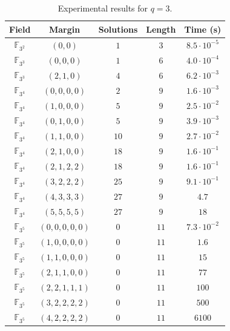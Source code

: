 \begin{table}
  \centering
  \begin{tabular}{|c|c|c|c|c|}
    \hline
    Field & Margin & Solutions & Length & Time (s) \\
    \hline
    \hline
    $\mathbb{F}_{3^2}$ & $(0,0)$ & $1$ & $3$ & $8.5\cdot10^{-5}$ \\
    \hline
    $\mathbb{F}_{3^3}$ & $(0,0,0)$ & $1$ & $6$ & $4.0\cdot10^{-4}$ \\
    \hline
    $\mathbb{F}_{3^3}$ & $(2,1,0)$ & $4$ & $6$ & $6.2\cdot10^{-3}$ \\
    \hline
    $\mathbb{F}_{3^4}$ & $(0,0,0,0)$ & $2$ & $9$ & $1.6\cdot10^{-3}$ \\
    \hline
    $\mathbb{F}_{3^4}$ & $(1,0,0,0)$ & $5$ & $9$ & $2.5\cdot10^{-2}$ \\
    \hline
    $\mathbb{F}_{3^4}$ & $(0,1,0,0)$ & $5$ & $9$ & $3.9\cdot10^{-3}$ \\
    \hline
    $\mathbb{F}_{3^4}$ & $(1,1,0,0)$ & $10$ & $9$ & $2.7\cdot10^{-2}$ \\
    \hline
    $\mathbb{F}_{3^4}$ & $(2,1,0,0)$ & $18$ & $9$ & $1.6\cdot10^{-1}$ \\
    \hline
    $\mathbb{F}_{3^4}$ & $(2,1,2,2)$ & $18$ & $9$ & $1.6\cdot10^{-1}$ \\
    \hline
    $\mathbb{F}_{3^4}$ & $(3,2,2,2)$ & $25$ & $9$ & $9.1\cdot10^{-1}$ \\
    \hline
    $\mathbb{F}_{3^4}$ & $(4,3,3,3)$ & $27$ & $9$ & $4.7$ \\
    \hline
    $\mathbb{F}_{3^4}$ & $(5,5,5,5)$ & $27$ & $9$ & $18$ \\
    \hline
    $\mathbb{F}_{3^5}$ & $(0,0,0,0,0)$ & $0$ & $11$ & $7.3\cdot10^{-2}$ \\
    \hline
    $\mathbb{F}_{3^5}$ & $(1,0,0,0,0)$ & $0$ & $11$ & $1.6$ \\
    \hline
    $\mathbb{F}_{3^5}$ & $(1,1,0,0,0)$ & $0$ & $11$ & $15$ \\
    \hline
    $\mathbb{F}_{3^5}$ & $(2,1,1,0,0)$ & $0$ & $11$ & $77$ \\
    \hline
    $\mathbb{F}_{3^5}$ & $(2,2,1,1,1)$ & $0$ & $11$ & $100$ \\
    \hline
    $\mathbb{F}_{3^5}$ & $(3,2,2,2,2)$ & $0$ & $11$ & $500$ \\
    \hline
    $\mathbb{F}_{3^5}$ & $(4,2,2,2,2)$ & $0$ & $11$ & $6100$ \\
    \hline
  \end{tabular}
  \caption{Experimental results for $q=3$.}
  \label{tab:trisym-3}
\end{table}
